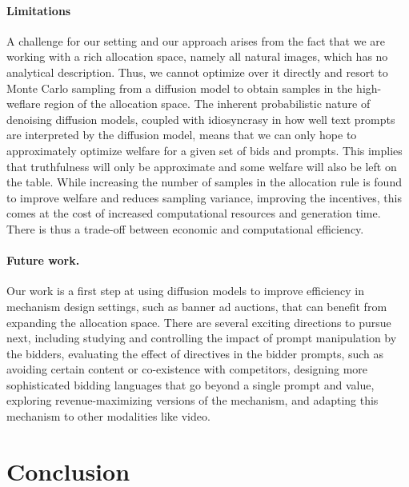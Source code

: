\documentclass[format=acmsmall, review=false]{acmart}
\begin{document}
\paragraph{Limitations}
A challenge for our setting and our approach arises from the fact that we are working with a rich allocation space, namely all natural images, which has no analytical description. Thus, we cannot optimize over it directly and resort to Monte Carlo sampling from a diffusion model to obtain samples in the high-weflare region of the allocation space.  The inherent probabilistic nature of denoising diffusion models, coupled with idiosyncrasy in how well text prompts are interpreted by the diffusion model, means that we can only hope to approximately optimize welfare for a given set of bids and prompts. This implies that truthfulness will only be approximate and some welfare will also be left on the table. While increasing the number of samples in the allocation rule is found to improve welfare and reduces sampling variance, improving the incentives, this comes at the cost of increased computational resources and generation time. There is thus a trade-off between economic and computational efficiency.

\paragraph{Future work.}
Our work is a first step at using diffusion models to improve efficiency in mechanism design settings, such as banner ad auctions, that can benefit from expanding the allocation space. There are several exciting directions to pursue next, including studying and controlling the impact of prompt manipulation by the bidders, evaluating the effect of directives in the bidder prompts, such as avoiding certain content or co-existence with competitors,  designing more sophisticated bidding languages that go beyond a single prompt and value, exploring revenue-maximizing versions of the mechanism, and adapting this mechanism to other  modalities like video.

\section{Conclusion}
\end{document}
